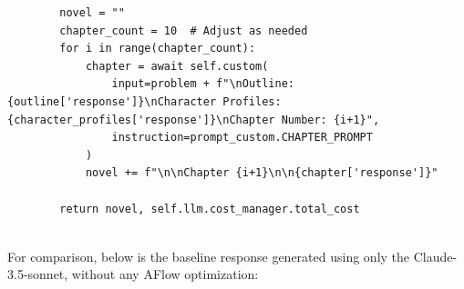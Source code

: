 \documentclass{article} %
\newcommand{\model}{{\sc AFlow}\xspace}
\theoremstyle{plain}
\theoremstyle{definition}
\theoremstyle{remark}
\begin{document}
\begin{tcolorbox}[title={\textbf{\small Novel generation workflow}}, boxrule=2pt, arc=0mm, breakable]
\begin{verbatim}
        novel = ""
        chapter_count = 10  # Adjust as needed
        for i in range(chapter_count):
            chapter = await self.custom(
                input=problem + f"\nOutline: {outline['response']}\nCharacter Profiles: {character_profiles['response']}\nChapter Number: {i+1}",
                instruction=prompt_custom.CHAPTER_PROMPT
            )
            novel += f"\n\nChapter {i+1}\n\n{chapter['response']}"
        
        return novel, self.llm.cost_manager.total_cost


\end{verbatim}
\end{tcolorbox}

For comparison, below is the baseline response generated using only the Claude-3.5-sonnet, without any \model optimization:

\label{appendix:llm generate novel}
\end{document}
